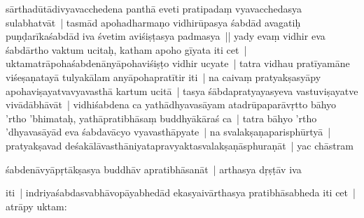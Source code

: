 \documentclass[article,12pt,a4paper]{memoir}%
\newcounter{parCount}
\begin{document}
sārthadūtādivyavacchedena panthā eveti pratipadaṃ vyavacchedasya sulabhatvāt | tasmād apohadharmaṇo vidhirūpasya śabdād avagatiḥ puṇḍarīkaśabdād iva śvetim aviśiṣṭasya padmasya || \label{thakur75-60.16} yady evaṃ vidhir eva śabdārtho vaktum ucitaḥ, katham apoho gīyata iti cet | uktamatrāpohaśabdenānyāpohaviśiṣṭo vidhir ucyate | tatra vidhau pratīyamāne viśeṣaṇatayā tulyakālam anyāpohapratītir iti | \label{thakur75-60.19} na caivaṃ pratyakṣasyāpy apohaviṣayatvavyavasthā kartum ucitā | tasya śābdapratyayasyeva vastuviṣayatve vivādābhāvāt | vidhiśabdena ca yathādhyavasāyam atadrūpaparāvṛtto bāhyo 'rtho 'bhimataḥ, yathāpratibhāsaṃ buddhyākāraś ca | tatra bāhyo 'rtho 'dhyavasāyād eva śabdavācyo vyavasthāpyate | na svalakṣaṇaparisphūrtyā | pratyakṣavad deśakālāvasthāniyatapravyaktasvalakṣaṇāsphuraṇāt | yac chāstram
	{}
	\pend%
      

	  
	  \pstart \leavevmode%
	śabdenāvyāpṛtākṣasya buddhāv apratibhāsanāt | arthasya dṛṣṭāv iva 
	{}
	\pend%
      

	  
	  \pstart \leavevmode%
	iti | indriyaśabdasvabhāvopāyabhedād ekasyaivārthasya pratibhāsabheda iti cet | atrāpy uktam:
	{}
	\pend%
      
\end{document}
